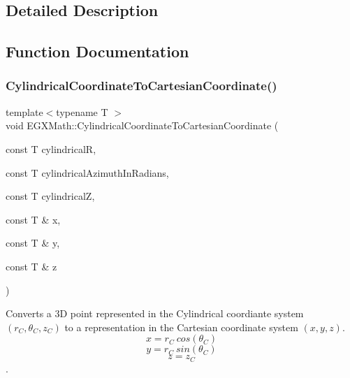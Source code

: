 \subsection{Detailed Description}


\subsection{Function Documentation}
\mbox{\label{group___e_g_x_math-_conversions-_coordinate_conversions-3_d-_cylindrical_gafaf535c9c6d2f0b4cfd9fa975d26ed4f}} 
\subsubsection{\texorpdfstring{Cylindrical\+Coordinate\+To\+Cartesian\+Coordinate()}{CylindricalCoordinateToCartesianCoordinate()}}
{\footnotesize\ttfamily template$<$typename T $>$ \\
void E\+G\+X\+Math\+::\+Cylindrical\+Coordinate\+To\+Cartesian\+Coordinate (\begin{DoxyParamCaption}\item[{const T}]{cylindricalR,  }\item[{const T}]{cylindrical\+Azimuth\+In\+Radians,  }\item[{const T}]{cylindricalZ,  }\item[{const T \&}]{x,  }\item[{const T \&}]{y,  }\item[{const T \&}]{z }\end{DoxyParamCaption})}



Converts a 3D point represented in the Cylindrical coordiante system $(r_C,\theta_C,z_C)$ to a representation in the Cartesian coordinate system $(x,y,z)$. \[ x = r_C\ cos(\theta_C) \] \[ y = r_C\ sin(\theta_C) \] \[ z = z_C \]. 

